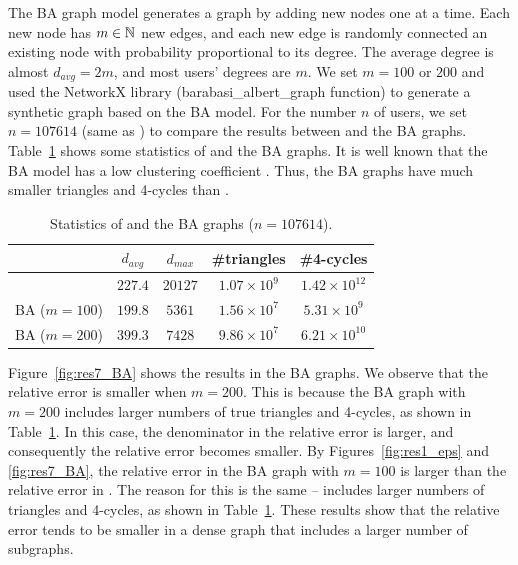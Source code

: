 The BA graph model generates a graph by adding new nodes one at a time.
Each new node has $m \in \mathbb{N}$ new edges, and each new edge is randomly connected an existing node with probability proportional to its degree.
The average degree is almost $d_{avg} = 2m$, and most users' degrees are $m$.
We set $m=100$ or $200$ and used the NetworkX library \cite{Hagberg_SciPy08} (barabasi\_albert\_graph function) to generate a synthetic graph based on the BA model.
For the number $n$ of users, we set $n=107614$ (same as \Gplus{}) to compare the results between \Gplus{} and the BA graphs.
Table~\ref{tab:BA_graphs} shows some statistics of \Gplus{} and the BA graphs.
It is well known that the BA model has a low clustering coefficient \cite{Holme_PRE02}.
Thus, the BA graphs have much smaller triangles and 4-cycles than \Gplus{}.

\begin{table}[t]
  \caption{Statistics of \Gplus{} and the BA graphs ($n=107614$).
  }
  \vspace{-4mm}
  \centering
  \begin{tabular}{|c|c|c|c|c|}
    \hline
    & $d_{avg}$ & $d_{max}$ & \#triangles & \#4-cycles\\ \hline
    \Gplus{} & $227.4$ & $20127$ & $1.07 \times 10^{9}$ & $1.42 \times 10^{12}$ \\ \hline
    BA ($m=100$) & $199.8$ & $5361$ & $1.56 \times 10^7$ & $5.31 \times 10^9$ \\ \hline
    BA ($m=200$) & $399.3$ & $7428$ & $9.86 \times 10^7$ & $6.21 \times 10^{10}$ \\ \hline
  \end{tabular}
  \label{tab:BA_graphs}
\end{table}

Figure~\ref{fig:res7_BA} shows the results in the BA graphs.
We observe that the relative error is smaller when $m=200$.
This is because the BA graph with $m=200$ includes larger numbers of true triangles and 4-cycles,
as shown in Table~\ref{tab:BA_graphs}.
In this case, the denominator in the relative error is larger, and consequently the relative error becomes smaller.
By Figures~\ref{fig:res1_eps} and \ref{fig:res7_BA}, the relative error in the BA graph with $m=100$ is larger than the relative error in \Gplus{}.
The reason for this is the same -- \Gplus{} includes larger numbers of triangles and 4-cycles, as shown in Table~\ref{tab:BA_graphs}.
These results show that the relative error tends to be smaller in a dense graph that includes a larger number of subgraphs.


